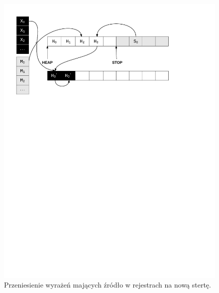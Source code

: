 \begin{figure}[p]
\centerline{\includegraphics[scale=0.75, clip, trim=10mm 185mm 45mm 10mm]{gc_2}}
\caption{Przeniesienie wyrażeń mających źródło w rejestrach na nową stertę.}
\label{fig:gc2}
\end{figure}

